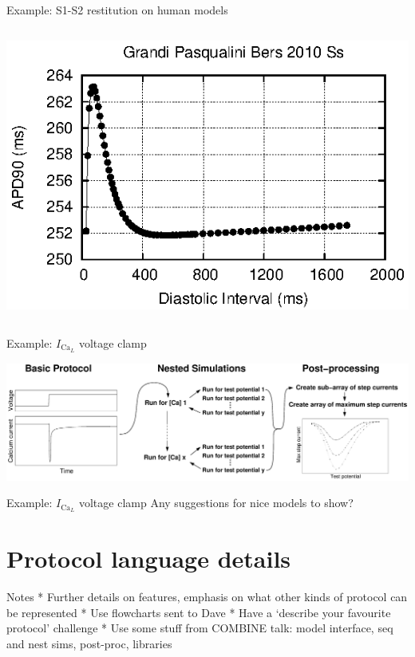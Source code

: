 \documentclass[t,xcolor={usenames,dvipsnames}]{beamer}
\begin{document}
\begin{frame}{Example: S1-S2 restitution on human models}
\begin{columns}[T]
\begin{column}{.33\linewidth}
\begin{center}
\vspace{.1cm}
\includegraphics[width=\textwidth]{grandi_pasqualini_bers_2010_ss_s1s2_curve}
\end{center}
\end{column}
\end{columns}
\end{frame}

\begin{frame}{Example: $I_{\textrm{Ca}_L}$ voltage clamp}
\begin{center}
\includegraphics[width=\textwidth]{ICaLIntro}
\end{center}
\end{frame}

\begin{frame}{Example: $I_{\textrm{Ca}_L}$ voltage clamp}
Any suggestions for nice models to show?
\end{frame}

\section{Protocol language details}

\begin{frame}{Notes}
 * Further details on features, emphasis on what other kinds of protocol can be represented
 * Use flowcharts sent to Dave
 * Have a `describe your favourite protocol' challenge
 * Use some stuff from COMBINE talk: model interface, seq and nest sims, post-proc, libraries
\end{frame}
\end{document}
